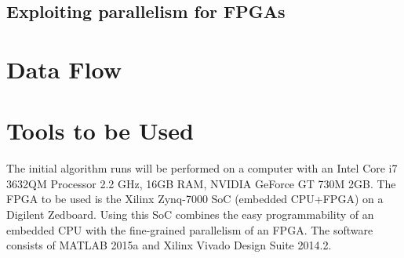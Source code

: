 \subsection{Exploiting parallelism for FPGAs}

\section{Data Flow}

\section{Tools to be Used}
The initial algorithm runs will be performed on a computer with an Intel Core i7 3632QM Processor 2.2 GHz, 16GB RAM, NVIDIA GeForce GT 730M 2GB. 
The FPGA to be used is the Xilinx Zynq-7000 SoC (embedded CPU+FPGA) on a Digilent Zedboard.
Using this SoC combines the easy programmability of an embedded CPU with the fine-grained parallelism of an FPGA.
The software consists of MATLAB 2015a and Xilinx Vivado Design Suite 2014.2.